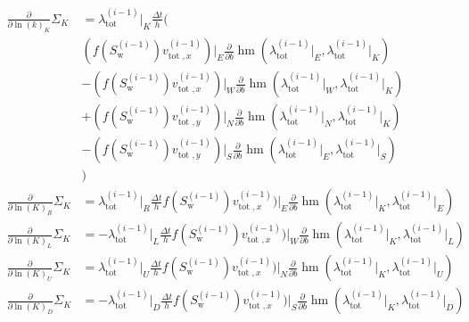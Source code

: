 \documentclass[conference]{IEEEtran}
\newcommand*{\pdiff}[2]{\ensuremath{\frac{\partial}{\partial{#2}}{#1}}}
\DeclareMathOperator*{\hmean}{hm}
\begin{document}
\begin{align}
\pdiff{\Sigma_K}{\ln(k)_K} &= \lambda_{\text{tot}}^{(i-1)}\lvert_K \frac{\Delta t}{h} \biggr(\\&(f(S_\text{w}^{(i-1)})v_{\text{tot }, x}^{(i-1)})\lvert_E\pdiff{\hmean}{b}(\lambda_\text{tot}^{(i-1)}\lvert_E, \lambda_\text{tot}^{(i-1)}\lvert_K)  \nonumber\\&- (f(S_\text{w}^{(i-1)})v_{\text{tot }, x}^{(i-1)})\lvert_W\pdiff{\hmean}{b}(\lambda_\text{tot}^{(i-1)}\lvert_W, \lambda_\text{tot}^{(i-1)}\lvert_K) \nonumber\\&+ (f(S_\text{w}^{(i-1)})v_{\text{tot }, y}^{(i-1)})\lvert_N\pdiff{\hmean}{b}(\lambda_\text{tot}^{(i-1)}\lvert_N, \lambda_\text{tot}^{(i-1)}\lvert_K) \nonumber\\&- (f(S_\text{w}^{(i-1)})v_{\text{tot }, y}^{(i-1)})\lvert_S\pdiff{\hmean}{b}(\lambda_\text{tot}^{(i-1)}\lvert_E, \lambda_\text{tot}^{(i-1)}\lvert_S)\nonumber\\&\biggr) \nonumber \\
\pdiff{\Sigma_K}{\ln(K)_R} &= \lambda_{\text{tot}}^{(i-1)}\lvert_R \frac{\Delta t}{h} f(S_\text{w}^{(i-1)})v_{\text{tot }, x}^{(i-1)})\lvert_E\pdiff{\hmean}{b}(\lambda_\text{tot}^{(i-1)}\lvert_K, \lambda_\text{tot}^{(i-1)}\lvert_E) \\
\pdiff{\Sigma_K}{\ln(K)_L} &= -\lambda_{\text{tot}}^{(i-1)}\lvert_L\frac{\Delta t}{h} f(S_\text{w}^{(i-1)})v_{\text{tot }, x}^{(i-1)})\lvert_W\pdiff{\hmean}{b}(\lambda_\text{tot}^{(i-1)}\lvert_K, \lambda_\text{tot}^{(i-1)}\lvert_L) \\
\pdiff{\Sigma_K}{\ln(K)_U} &= \lambda_{\text{tot}}^{(i-1)}\lvert_U \frac{\Delta t}{h} f(S_\text{w}^{(i-1)})v_{\text{tot }, x}^{(i-1)})\lvert_N\pdiff{\hmean}{b}(\lambda_\text{tot}^{(i-1)}\lvert_K, \lambda_\text{tot}^{(i-1)}\lvert_U) \\
\pdiff{\Sigma_K}{\ln(K)_D} &= -\lambda_{\text{tot}}^{(i-1)}\lvert_D\frac{\Delta t}{h} f(S_\text{w}^{(i-1)})v_{\text{tot }, x}^{(i-1)})\lvert_S\pdiff{\hmean}{b}(\lambda_\text{tot}^{(i-1)}\lvert_K, \lambda_\text{tot}^{(i-1)}\lvert_D)
\end{align}
%
%
\end{document}
